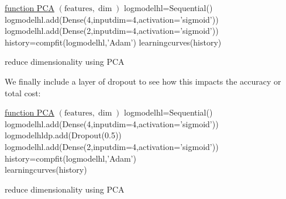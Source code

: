 \documentclass[14pt]{article}
\theoremstyle{plain}
\theoremstyle{definition}
\newcommand{\un}{\textunderscore}
\begin{document}
 \begin{algorithm}

    \underline{function PCA} $(\textrm{features}, \dim)$\;
    log\un model\un	hl=Sequential()
	log\un model\un hl.add(Dense(4,input\un dim=4,activation='sigmoid'))
	log\un model\un hl.add(Dense(2,input\un dim=4,activation='sigmoid'))
	history=comp\un fit(log\un model\un hl,'Adam')
	learning\un curves(history)    
	\caption{reduce dimensionality using PCA }
\end{algorithm}  

We finally include a layer of dropout to see how this impacts the accuracy or total cost:
 \begin{algorithm}

    \underline{function PCA} $(\textrm{features}, \dim)$\;
    log\un model\un	hl=Sequential()
	log\un model\un hl.add(Dense(4,input\un dim=4,activation='sigmoid'))\\
	log\un model\un hl\un dp.add(Dropout(0.5))\\	
	log\un model\un hl.add(Dense(2,input\un dim=4,activation='sigmoid'))\\
	history=comp\un fit(log\un model\un hl,'Adam')\\
	learning\un curves(history)    
	\caption{reduce dimensionality using PCA }
\end{algorithm}\\


\newpage
\end{document}
